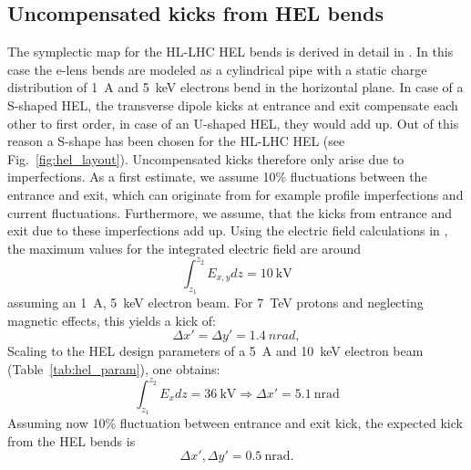 \documentclass[%
 reprint,
 amsmath,amssymb,
 aps,
prstab,
]{revtex4-1}
\newcommand{\q}[2]{\ensuremath{#1\ \mathrm{#2}}} %
\begin{document}
\subsection{Uncompensated kicks from HEL bends}
\label{core:sec:1}
The symplectic map for the HL-LHC HEL bends is derived in detail in \cite{hel_bends_stancari}. In this case the e-lens bends are modeled as a cylindrical pipe with a static charge distribution of 1~A and 5~keV electrons bend in the horizontal plane. In case of a S-shaped HEL, the transverse dipole kicks at entrance and exit compensate each other to first order, in case of an U-shaped HEL, they would add up. Out of this reason a S-shape has been chosen for the HL-LHC HEL (see Fig.~\ref{fig:hel_layout}). Uncompensated kicks therefore only arise due to imperfections. As a first estimate, we assume 10\% fluctuations between the entrance and exit, which can originate from for example profile imperfections and current fluctuations. Furthermore, we assume, that the kicks from entrance and exit due to these imperfections add up. Using the electric field calculations in \cite{hel_bends_stancari}, the maximum values for the integrated electric field are around
\begin{equation}
\int_{z_1}^{z_2} E_{x,y} dz= 10 \ \mathrm{kV}
\end{equation}
assuming an \SI{1}{A}, \SI{5}{keV} electron beam. For \SI{7}{TeV} protons and neglecting magnetic effects, this yields a kick of:
\begin{equation}
\Delta x'=\Delta y'= \SI{1.4}{nrad},
\end{equation}
Scaling to the HEL design parameters of a \SI{5}{A} and \SI{10}{keV} electron beam (Table~\ref{tab:hel_param}), one obtains:
\begin{equation}
\int_{z_1}^{z_2} E_{x} dz= 36 \ \mathrm{kV} \Rightarrow \Delta x'= \q{5.1}{nrad}
\end{equation}
Assuming now 10\% fluctuation between entrance and exit kick, the expected kick from the HEL bends is
\begin{equation}\label{eqn:kick_bends}
\Delta x', \Delta y'= \q{0.5}{nrad}.
\end{equation}
\end{document}
